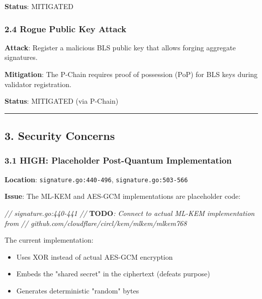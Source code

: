 \documentclass[
]{article}
\newenvironment{Shaded}{}{}
\newcommand{\AlertTok}[1]{\textcolor[rgb]{1.00,0.00,0.00}{\textbf{#1}}}
\newcommand{\CommentTok}[1]{\textcolor[rgb]{0.38,0.63,0.69}{\textit{#1}}}
\providecommand{\tightlist}{%
  \setlength{\itemsep}{0pt}\setlength{\parskip}{0pt}}
\begin{document}
\textbf{Status}: MITIGATED

\subsubsection{2.4 Rogue Public Key
Attack}\label{24-rogue-public-key-attack}

\textbf{Attack}: Register a malicious BLS public key that allows forging
aggregate signatures.

\textbf{Mitigation}: The P-Chain requires proof of possession (PoP) for
BLS keys during validator registration.

\textbf{Status}: MITIGATED (via P-Chain)

\begin{center}\rule{0.5\linewidth}{0.5pt}\end{center}

\subsection{3. Security Concerns}\label{3-security-concerns}

\subsubsection{3.1 HIGH: Placeholder Post-Quantum
Implementation}\label{31-high-placeholder-post-quantum-implementation}

\textbf{Location}: \texttt{signature.go:440-496},
\texttt{signature.go:503-566}

\textbf{Issue}: The ML-KEM and AES-GCM implementations are placeholder
code:

\begin{Shaded}
\begin{Highlighting}[]
\CommentTok{// signature.go:440{-}441}
\CommentTok{// }\AlertTok{TODO}\CommentTok{: Connect to actual ML{-}KEM implementation from}
\CommentTok{// github.com/cloudflare/circl/kem/mlkem/mlkem768}
\end{Highlighting}
\end{Shaded}

The current implementation:

\begin{itemize}
\tightlist
\item
  Uses XOR instead of actual AES-GCM encryption
\item
  Embeds the "shared secret" in the ciphertext (defeats purpose)
\item
  Generates deterministic "random" bytes
\end{itemize}
\end{document}
